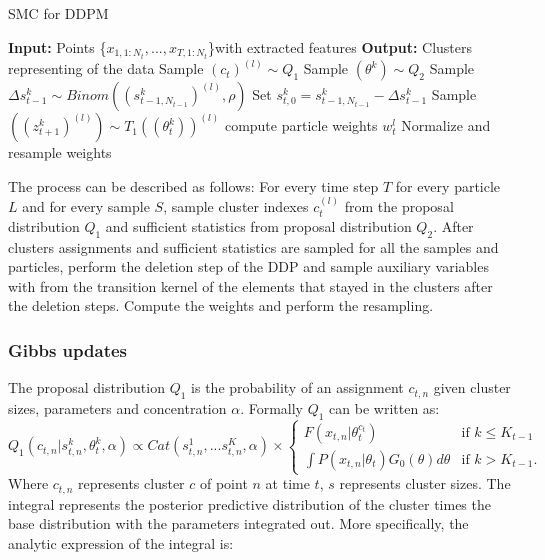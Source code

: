\documentclass[twoside,hidelinks]{article}
\begin{document}
\begin{algorithm}[ht!]
  \caption{SMC for DDPM}\label{SMC}
  \begin{algorithmic}[1]
	\State \textbf{Input:} Points \{$x_{1,1:N_t}, ..., x_{T,1:N_t}$\}with extracted features
	\State \textbf{Output:} Clusters representing of the data
								\State Sample $(c_t)^{(l)} \sim Q_1$  
								\State Sample $(\theta^k ) \sim Q_2$
						    \EndFor		
			   \State Sample $\Delta s_{t-1}^k \sim Binom( (s_{t-1,N_{t-1}}^k)^{(l)}, \rho) $ 
		       \State Set $s_{t,0}^{k} = s_{t-1,N_{t-1}}^{k} -\Delta s_{t-1}^k$
   		       \State Sample $( (z_{t+1}^k)^{(l)} ) \sim T_1((\theta_t^k))^{(l)} $
		    \EndFor
		 	\State compute particle weights $w_t^l$
		    \EndFor
    \State Normalize and resample weights
    \EndFor
  \end{algorithmic}
\end{algorithm}

The process can be described as follows:
For every time step $T$ for every particle $L$ and for every sample $S$, sample cluster indexes $c_t^{(l)}$ from the proposal distribution $Q_1$ and sufficient statistics from proposal distribution $Q_2$. After clusters assignments and sufficient statistics are sampled for all the samples and particles, perform the deletion step of the DDP and sample auxiliary variables with from the transition kernel of the elements that stayed in the clusters after the deletion steps. Compute the weights and perform the resampling. 

\subsubsection{Gibbs updates}
The proposal distribution $Q_1$ is the probability of an assignment $c_{t,n}$ given cluster sizes, parameters and concentration $\alpha$. Formally $Q_1$ can be written as:
\begin{equation} \label{Gibbs}
 Q_1(c_{t,n} | s_{t,n}^k, \theta_t^k, \alpha) \propto Cat( s_{t,n}^1,...s_{t,n}^K, \alpha ) \times
 	\begin{cases} 
 	F(x_{t,n} | \theta_t^{c_t} )  &\mbox{if } k \leq K_{t-1} \\
 	\int P(x_{t,n} | \theta_t )G_0(\theta) d\theta & \mbox{if } k > K_{t-1}. \end{cases}
\end{equation}
Where $c_{t,n}$ represents cluster $c$ of point $n$ at time $t$, $s$ represents cluster sizes. The integral represents the posterior predictive distribution of the cluster times the base distribution with the parameters integrated out. More specifically, the analytic expression of the integral is:
\end{document}
